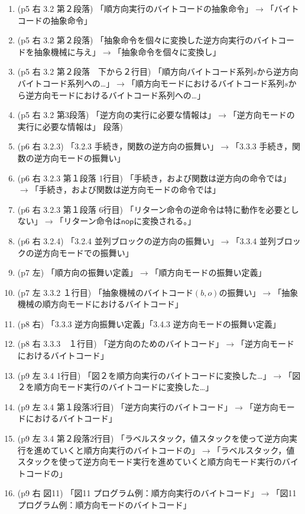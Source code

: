 \documentclass[a4j]{jarticle}
\begin{document}
\begin{enumerate}
\item (p5 右 3.2 第２段落)  「順方向実行のバイトコードの抽象命令」$\rightarrow$「バイトコードの抽象命令」
\item (p5 右 3.2 第２段落)   「抽象命令を個々に変換した逆方向実行のバイトコードを抽象機械に与え」$\rightarrow$「抽象命令を個々に変換し」
\item (p5 右 3.2 第２段落　下から２行目) 「順方向バイトコード系列$s$から逆方向バイトコード系列への…」$\rightarrow$「順方向モードにおけるバイトコード系列$s$から逆方向モードにおけるバイトコード系列への…」
\item (p5 右 3.2 第3段落) 「逆方向の実行に必要な情報は」$\rightarrow$「逆方向モードの実行に必要な情報は」
段落)   
\item (p6 右 3.2.3) 「3.2.3 手続き，関数の逆方向の振舞い」$\rightarrow$「3.3.3 手続き，関数の逆方向モードの振舞い」
\item (p6 右 3.2.3 第１段落 1行目) 「手続き，および関数は逆方向の命令では」$\rightarrow$「手続き，および関数は逆方向モードの命令では」
\item (p6 右 3.2.3 第１段落 6行目) 「リターン命令の逆命令は特に動作を必要としない」$\rightarrow$「リターン命令は$\mathsf{nop}$に変換される。」
\item (p6 右 3.2.4) 「3.2.4 並列ブロックの逆方向の振舞い」$\rightarrow$「3.3.4 並列ブロックの逆方向モードでの振舞い」
\item (p7 左) 「順方向の振舞い定義」$\rightarrow$「順方向モードの振舞い定義」
\item (p7 左 3.3.2 １行目)  「抽象機械のバイトコード$(b,o)$の振舞い」$\rightarrow$「抽象機械の順方向モードにおけるバイトコード」
\item (p8 右) 「3.3.3 逆方向振舞い定義」「3.4.3 逆方向モードの振舞い定義」
\item (p8 右 3.3.3　１行目) 「逆方向のためのバイトコード」$\rightarrow$「逆方向モードにおけるバイトコード」
\item (p9 左 3.4 1行目) 「図２を順方向実行のバイトコードに変換した…」$\rightarrow$「図２を順方向モード実行のバイトコードに変換した…」
\item (p9 左 3.4 第１段落3行目) 「逆方向実行のバイトコード」$\rightarrow$「逆方向モードにおけるバイトコード」
\item (p9 左 3.4 第２段落2行目) 「ラベルスタック，値スタックを使って逆方向実行を進めていくと順方向実行のバイトコードの」$\rightarrow$「ラベルスタック，値スタックを使って逆方向モード実行を進めていくと順方向モード実行のバイトコードの」
\item (p9 右 図11) 「図11 プログラム例：順方向実行のバイトコード」$\rightarrow$「図11 プログラム例：順方向モードのバイトコード」

\end{enumerate}
\end{document}
